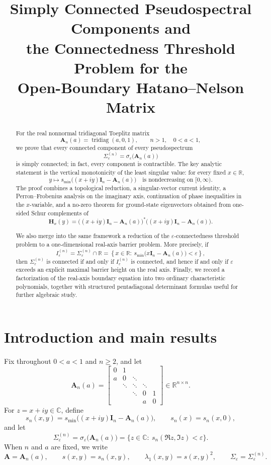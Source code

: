 \documentclass[11pt]{article}
\title{Simply Connected Pseudospectral Components and\\
the Connectedness Threshold Problem for the\\
Open-Boundary Hatano--Nelson Matrix}
\author{}
\date{}
\numberwithin{equation}{section}
\newcommand{\R}{\mathbb R}
\newcommand{\C}{\mathbb C}
\newcommand{\A}{\mathbf A}
\newcommand{\I}{\mathbf I}
\newcommand{\Hmat}{\mathbf H}
\newcommand{\tridiag}{\operatorname{tridiag}}
\newcommand{\smin}{s_{\min}}
\begin{document}
\maketitle

\begin{abstract}
For the real nonnormal tridiagonal Toeplitz matrix
\[
\A_n(a)=\tridiag(a,0,1),\qquad n>1,\quad 0<a<1,
\]
we prove that every connected component of every pseudospectrum
\[
\Sigma_\varepsilon^{(n)}
=
\sigma_\varepsilon\!\bigl(\A_n(a)\bigr)
\]
is simply connected; in fact, every component is contractible.  The key analytic
statement is the vertical monotonicity of the least singular value:
for every fixed \(x\in\R\),
\[
y\longmapsto \smin\!\bigl((x+iy)\I_n-\A_n(a)\bigr)
\quad\text{is nondecreasing on }[0,\infty).
\]
The proof combines a topological reduction, a singular-vector current identity,
a Perron--Frobenius analysis on the imaginary axis, continuation of phase
inequalities in the \(x\)-variable, and a no-zero theorem for ground-state
eigenvectors obtained from one-sided Schur complements of
\[
\Hmat_x(y)=\bigl((x+iy)\I_n-\A_n(a)\bigr)^*
\bigl((x+iy)\I_n-\A_n(a)\bigr).
\]

We also merge into the same framework a reduction of the
\(\varepsilon\)-connectedness threshold problem to a one-dimensional real-axis
barrier problem.  More precisely, if
\[
I_\varepsilon^{(n)}
=
\Sigma_\varepsilon^{(n)}\cap \R
=
\left\{x\in\R:\ \smin\!\bigl(x\I_n-\A_n(a)\bigr)<\varepsilon\right\},
\]
then \(\Sigma_\varepsilon^{(n)}\) is connected if and only if \(I_\varepsilon^{(n)}\)
is connected, and hence if and only if \(\varepsilon\) exceeds an explicit maximal
barrier height on the real axis.  Finally, we record a factorization of the real-axis
boundary equation into two ordinary characteristic polynomials, together with
structured pentadiagonal determinant formulas useful for further algebraic study.
\end{abstract}

\section{Introduction and main results}

Fix throughout \(0<a<1\) and \(n\ge2\), and let
\[
\A_n(a)=
\begin{bmatrix}
0 & 1 \\
a & 0 & \ddots \\
& \ddots & \ddots & \ddots \\
&& \ddots & 0 & 1 \\
&&& a & 0
\end{bmatrix}\in\R^{n\times n}.
\]
For \(z=x+iy\in\C\), define
\[
s_n(x,y)=\smin\!\bigl((x+iy)\I_n-\A_n(a)\bigr),
\qquad
s_n(x)=s_n(x,0),
\]
and let
\[
\Sigma_\varepsilon^{(n)}
=
\sigma_\varepsilon\!\bigl(\A_n(a)\bigr)
=
\{z\in\C:\ s_n(\Re z,\Im z)<\varepsilon\}.
\]
When \(n\) and \(a\) are fixed, we write
\[
\A=\A_n(a),\qquad
s(x,y)=s_n(x,y),\qquad
\lambda_1(x,y)=s(x,y)^2,\qquad
\Sigma_\varepsilon=\Sigma_\varepsilon^{(n)}.
\]
\end{document}

